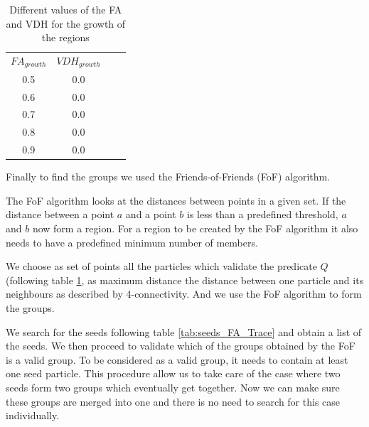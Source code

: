 \documentclass[12pt]{article}
\begin{document}
\begin{itemize}
\begin{table}[ht]
    \centering
    \begin{tabular}{|c|c|c|c|}
        $FA_{growth}$ & $VDH_{growth}$ \\
        0.5 &  0.0 \\
        0.6 &  0.0 \\
        0.7 &  0.0 \\
        0.8 &  0.0 \\
        0.9 &  0.0 \\
    \end{tabular}
    \caption{Different values of the FA and VDH for the growth of the regions}
    \label{tab:search_FA_Trace}
\end{table}
\FloatBarrier

\end{itemize}



\begin{par}
Finally to find the groups we used the Friends-of-Friends (FoF) algorithm.
\end{par}

\begin{par}
The FoF algorithm looks at the distances between points in a given
set. If the distance between a point $a$ and a point $b$ is less
than a predefined threshold, $a$ and $b$ now form a region. For a
region to be created by the FoF algorithm it also needs to have a
predefined minimum number of members. 
\end{par}

\begin{par}
We choose as set of points all the
particles which validate the predicate $Q$ (following table
\ref{tab:search_FA_Trace}, as maximum distance the distance
between one particle and its neighbours as described by
4-connectivity. And we use the FoF algorithm to form the groups. 
\end{par}
\begin{par}
We search for the seeds following table \ref{tab:seeds_FA_Trace}
and obtain a list of the seeds. We then proceed to validate which
of the groups obtained by the FoF is a valid group. To be
considered as a valid group, it needs to contain at least one seed
particle. This procedure allow us to take care of the case where
two seeds form two groups which eventually get together. Now we
can make sure these groups are merged into one and there is no
need to search for this case individually.
\end{par}
\end{document}
